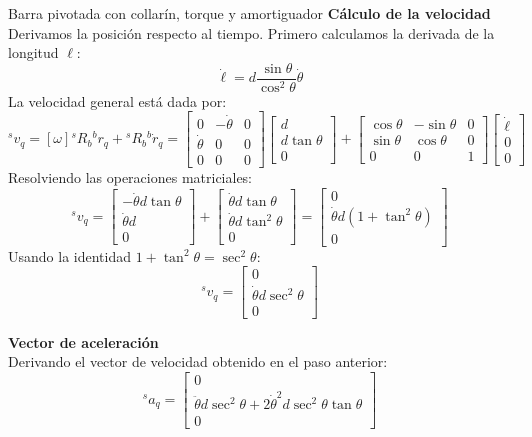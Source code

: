 \begin{solucion}{Barra pivotada con collarín, torque y amortiguador}
\textbf{Cálculo de la velocidad}\\
Derivamos la posición respecto al tiempo. Primero calculamos la derivada de la longitud $\ell$:
$$
\dot{\ell} = d \frac{\sin \theta}{\cos^2 \theta} \dot{\theta}
$$
La velocidad general está dada por:
$$
{}^s v_q = [\omega] {}^s R_b {}^b r_q + {}^s R_b {}^b \dot{r}_q =
\begin{bmatrix}
    0 & -\dot{\theta} & 0 \\
    \dot{\theta} & 0 & 0 \\
    0 & 0 & 0
\end{bmatrix}
\begin{bmatrix}
    d \\ d \tan \theta \\ 0
\end{bmatrix} +
\begin{bmatrix}
    \cos \theta & -\sin \theta & 0 \\
    \sin \theta & \cos \theta & 0 \\
    0 & 0 & 1
\end{bmatrix}
\begin{bmatrix}
    \dot{\ell} \\ 0 \\ 0
\end{bmatrix}
$$
Resolviendo las operaciones matriciales:
$$
{}^s v_q =
\begin{bmatrix}
    -\dot{\theta} d \tan \theta \\ \dot{\theta} d \\ 0
\end{bmatrix} +
\begin{bmatrix}
    \dot{\theta} d \tan \theta \\ \dot{\theta} d \tan^2 \theta \\ 0
\end{bmatrix} =
\begin{bmatrix}
    0 \\ \dot{\theta} d (1 + \tan^2 \theta) \\ 0
\end{bmatrix}
$$
Usando la identidad $1 + \tan^2 \theta = \sec^2 \theta$:
$$
{}^s v_q = \begin{bmatrix} 0 \\ \dot{\theta} d \sec^2 \theta \\ 0 \end{bmatrix}
$$

\textbf{Vector de aceleración}\\
Derivando el vector de velocidad obtenido en el paso anterior:
$$
{}^s a_q =
\begin{bmatrix}
    0 \\ \ddot{\theta} d \sec^2 \theta + 2\dot{\theta}^2 d \sec^2 \theta \tan \theta \\ 0
\end{bmatrix}
$$


\end{solucion}
